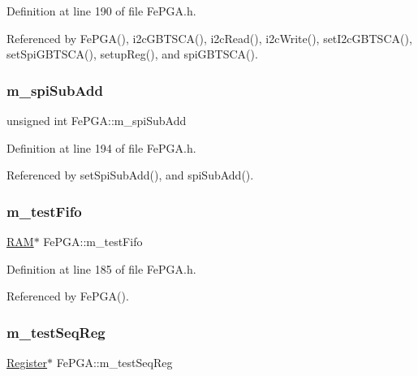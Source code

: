 Definition at line 190 of file Fe\+P\+G\+A.\+h.



Referenced by Fe\+P\+G\+A(), i2c\+G\+B\+T\+S\+C\+A(), i2c\+Read(), i2c\+Write(), set\+I2c\+G\+B\+T\+S\+C\+A(), set\+Spi\+G\+B\+T\+S\+C\+A(), setup\+Reg(), and spi\+G\+B\+T\+S\+C\+A().

\mbox{\label{classFePGA_a4f2f5d175aeb6dcaf497f81d2f075411}} 
\subsubsection{\texorpdfstring{m\+\_\+spi\+Sub\+Add}{m\_spiSubAdd}}
{\footnotesize\ttfamily unsigned int Fe\+P\+G\+A\+::m\+\_\+spi\+Sub\+Add\hspace{0.3cm}{\ttfamily [private]}}



Definition at line 194 of file Fe\+P\+G\+A.\+h.



Referenced by set\+Spi\+Sub\+Add(), and spi\+Sub\+Add().

\mbox{\label{classFePGA_a97fc9347c90d9a31d99ccb499cc06eee}} 
\subsubsection{\texorpdfstring{m\+\_\+test\+Fifo}{m\_testFifo}}
{\footnotesize\ttfamily \hyperlink{classRAM}{R\+AM}$\ast$ Fe\+P\+G\+A\+::m\+\_\+test\+Fifo\hspace{0.3cm}{\ttfamily [private]}}



Definition at line 185 of file Fe\+P\+G\+A.\+h.



Referenced by Fe\+P\+G\+A().

\mbox{\label{classFePGA_a67bc3c8f923b673100974fd86096393e}} 
\subsubsection{\texorpdfstring{m\+\_\+test\+Seq\+Reg}{m\_testSeqReg}}
{\footnotesize\ttfamily \hyperlink{classRegister}{Register}$\ast$ Fe\+P\+G\+A\+::m\+\_\+test\+Seq\+Reg\hspace{0.3cm}{\ttfamily [private]}}



